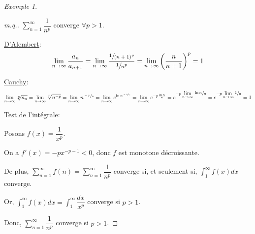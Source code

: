 \documentclass{report}
\newcommand*{\dsum}[4]{\displaystyle\sum_{#1=#2}^{#3}#4}
\newcommand*{\dlim}[3]{\displaystyle\lim_{#1 \to #2}#3}
\newcommand*{\dint}[3]{\displaystyle\int_{#1}^{#2}#3}
\theoremstyle{definition}
\theoremstyle{remark}
\newtheorem*{exem}{Exemple}
\begin{document}
	\begin{exem}~

		\begin{proof}[m.q.]
			$\dsum{n}{1}{\infty}{\dfrac{1}{n^p}}$ converge $\forall p > 1$.

			\underline{D'Alembert}:
			\[
			\dlim{n}{\infty}{\dfrac{a_n}{a_{n+1}}} = \dlim{n}{\infty}{\dfrac{\sfrac{1}{(n+1)^p}}{\sfrac{1}{n^p}}} = \dlim{n}{\infty}{\left( \dfrac{n}{n+1} \right)^p} = 1
			\]

			\underline{Cauchy}:
			\[
			\dlim{n}{\infty}{\sqrt[n]{a_n}} = \dlim{n}{\infty}{\sqrt[n]{n^{-p}}} = \dlim{n}{\infty}{n^{\sfrac{-p}{n}}} = \dlim{n}{\infty}{e^{\ln n^{\sfrac{-p}{n}}}} = \dlim{n}{\infty}{e^{-p\frac{\ln n}{n}}} = e^{-p \dlim{n}{\infty}{\sfrac{\ln n}{n}}} = e^{-p \dlim{n}{\infty}{\sfrac{1}{n}}} = 1
			\]

			\underline{Test de l'int\'egrale}:

			Posons $f(x) = \dfrac{1}{x^p}$.

			On a $f'(x) = -px^{-p-1}<0$, donc $f$ est monotone d\'ecroissante.

			De plus, $\dsum{n}{1}{\infty}{f(n)} = \dsum{n}{1}{\infty}{\dfrac{1}{n^p}}$ converge si, et seulement si, $\dint{1}{\infty}{f(x)dx}$ converge.

			Or, $\dint{1}{\infty}{f(x)dx} = \dint{1}{\infty}{\dfrac{dx}{x^p}}$ converge si $p>1$.

			Donc, $\dsum{n}{1}{\infty}{\dfrac{1}{n^p}}$ converge si $p>1$.
		\end{proof}
	\end{exem}
\end{document}
